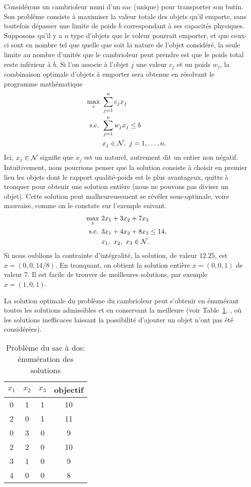 \begin{example}
Considérons un cambrioleur muni d'un sac (unique) pour transporter son butin.
Son problème consiste à maximiser la valeur totale des objets qu'il emporte, sans toutefois dépasser une limite de poids $b$ correspondant à ses capacités physiques.
Supposons qu'il y a $n$ type d'objets que le voleur pourrait emporter, et que ceux-ci sont en nombre tel que quelle que soit la nature de l'objet considéré, la seule limite au nombre d'unités que le cambrioleur peut prendre est que le poids total reste inférieur à $b$.
Si l'on associe à l'objet $j$ une valeur $c_j$ et un poids $w_j$, la combinaison optimale
d'objets à emporter sera obtenue en résolvant le programme mathématique
\begin{align*}
\max_x\ & \sum_{j = 1}^n c_j x_j \\
\text{s.c. } & \sum_{j = 1}^n w_j x_j \leq b \\
& x_j \in \mathcal{N}, \ j = 1,\ldots,n.
\end{align*}
Ici, $x_j \in \mathcal{N}$ signifie que $x_j$ est un naturel, autrement dit un entier non négatif.
Intuitivement, nous pourrions penser que la solution consiste à choisir en premier lieu les objets dont le rapport qualité-poids est le plus avantageux, quitte à tronquer pour obtenir une solution entière (nous ne pouvons pas diviser un objet).
Cette solution peut malheureusement se révéler sous-optimale, voire mauvaise, comme on le constate sur l'exemple suivant.
\begin{align*}
\max_x \ & 2x_1 + 3x_2 + 7x_3 \\
\text{s.c. } & 3x_1 + 4x_2 + 8x_3 \leq 14,\\
& x_1,\ x_2,\ x_3 \in \mathcal{N}.
\end{align*}
Si nous oublions la contrainte d'intégralité, la solution, de valeur $12.25$, est $x = (0, 0, 14/8)$.
En tronquant, on obtient la solution entière $x = (0, 0, 1)$ de valeur 7.
Il est facile de trouver de meilleures solutions, par exemple $x = (1, 0, 1)$.

La solution optimale du problème du cambrioleur peut s'obtenir en énumérant toutes les solutions admissibles et en conservant la meilleure (voir Table~\ref{tab:bagpack},
, où les solutions inefficaces laissant la possibilité d'ajouter un objet n'ont pas été considérées).

\begin{table}[htb]
\begin{center}
\begin{tabular}{cccc}
$x_1$ & $x_2$ & $x_3$ & objectif \\
\hline
0 & 1 & 1 & 10 \\
2 & 0 & 1 & 11 \\
0 & 3 & 0 & 9 \\
2 & 2 & 0 & 10 \\
3 & 1 & 0 & 9 \\
4 & 0 & 0 & 8 \\
\hline
\end{tabular}
\caption{Problème du sac à dos: énumération des solutions}
\label{tab:bagpack}
\end{center}
\end{table}


\end{example}
